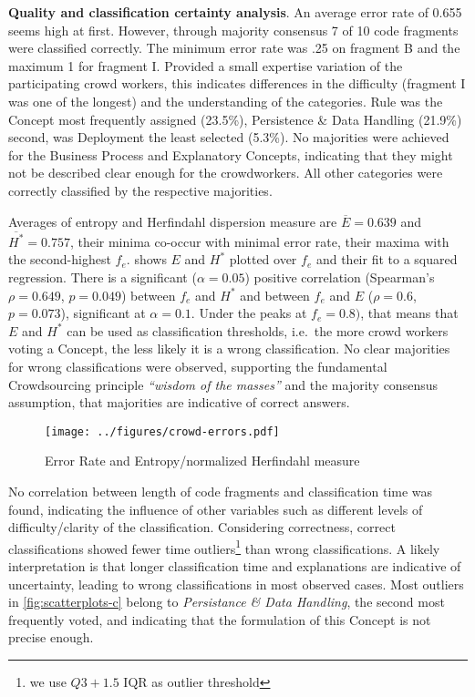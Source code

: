\textbf{Quality and classification certainty analysis}. An average error rate of 0.655 seems high at first.
However, through majority consensus 7 of 10 code fragments were classified correctly.
The minimum error rate was .25 on fragment B and the maximum 1 for fragment I.
Provided a small expertise variation of the participating crowd workers, this indicates differences in the difficulty (fragment I was one of the longest) and the understanding of the categories.
Rule was the \gls{Concept} most frequently assigned (23.5\%), Persistence \& Data Handling (21.9\%) second, was Deployment the least selected (5.3\%).
No majorities were achieved for the Business Process and Explanatory \glspl{Concept}, indicating that they might not be described clear enough for the crowdworkers.
All other categories were correctly classified by the respective majorities.

Averages of entropy and Herfindahl dispersion measure are \(\overline E = 0.639\) and \(\overline{H^*} = 0.757\), their minima co-occur with minimal error rate, their maxima with the second-highest \(f_e\).
 shows \(E\) and \(H^*\) plotted over \(f_e\) and their fit to a squared regression.
There is a significant (\(\alpha=0.05\)) positive correlation (Spearman's \(\rho=0.649\), \(p=0.049\)) between \(f_e\) and \(H^*\) and between \(f_e\) and \(E\) (\(\rho=0.6\), \(p=0.073\)), significant at \(\alpha=0.1\).
Under the peaks at \(f_e=0.8)\), that means that \(E\) and \(H^*\) can be used as classification thresholds, i.e.~the more crowd workers voting a \gls{Concept}, the less likely it is a wrong classification.
No clear majorities for wrong classifications were observed, supporting the fundamental \gls{Crowdsourcing} principle \emph{``wisdom of the masses''} and the majority consensus assumption, that majorities are indicative of correct answers.

\begin{figure}[h!]
\hypertarget{fig:crowd-errors}{%
\centering
\texttt{[image: ../figures/crowd-errors.pdf]}
\caption{Error Rate and Entropy/normalized Herfindahl measure}\label{fig:crowd-errors}
}
\end{figure}

No correlation between length of code fragments and classification time was found, indicating the influence of other variables such as different levels of difficulty/clarity of the classification.
Considering correctness, correct classifications showed fewer time outliers\footnote{we use \(Q3 + 1.5 \text{ IQR}\) as outlier threshold} than wrong classifications.
A likely interpretation is that longer classification time and explanations are indicative of uncertainty, leading to wrong classifications in most observed cases.
Most outliers in \cref{fig:scatterplots-c} belong to \emph{Persistance \& Data Handling}, the second most frequently voted, and indicating that the formulation of this \gls{Concept} is not precise enough.

